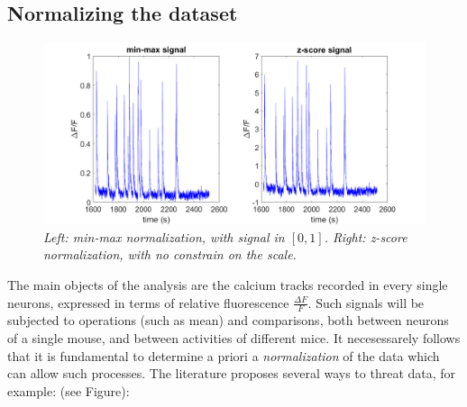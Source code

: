 \documentclass[a4paper]{article}
\begin{document}
\subsection{Normalizing the dataset}


\begin{figure}[H]
	
	\begin{center}
		\hspace*{-2.1cm}
		\includegraphics[scale=.45]{normalizations.png} 
	\end{center} 
	\caption{\textit{Left: min-max normalization, with signal in $[0,1]$. Right: z-score normalization, with no constrain on the scale. }}
	
\end{figure}
The main objects of the analysis are the calcium tracks recorded in every single neurons, expressed in terms of relative fluorescence $\frac{\Delta F}{F}$. Such signals will be subjected to operations (such as mean) and comparisons, both between neurons of a single mouse, and between activities of different mice. It necesessarely follows that it is fundamental to determine a priori a \textit{normalization} of the data which can allow such processes. The literature proposes several ways to threat data, for example: (see Figure):
\end{document}
